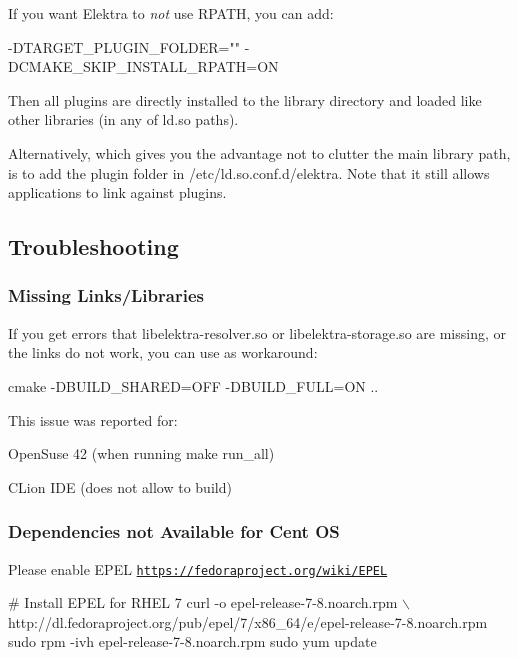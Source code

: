 If you want Elektra to {\itshape not} use {\ttfamily R\+P\+A\+TH}, you can add\+:


\begin{DoxyCode}
-DTARGET\_PLUGIN\_FOLDER="" -DCMAKE\_SKIP\_INSTALL\_RPATH=ON
\end{DoxyCode}


Then all plugins are directly installed to the library directory and loaded like other libraries (in any of {\ttfamily ld.\+so} paths).

Alternatively, which gives you the advantage not to clutter the main library path, is to add the plugin folder in {\ttfamily /etc/ld.so.\+conf.\+d/elektra}. Note that it still allows applications to link against plugins.

\subsection*{Troubleshooting}

\subsubsection*{Missing Links/\+Libraries}

If you get errors that {\ttfamily libelektra-\/resolver.\+so} or {\ttfamily libelektra-\/storage.\+so} are missing, or the links do not work, you can use as workaround\+:


\begin{DoxyCode}
cmake -DBUILD\_SHARED=OFF -DBUILD\_FULL=ON ..
\end{DoxyCode}


This issue was reported for\+:


\begin{DoxyItemize}
\item Open\+Suse 42 (when running {\ttfamily make run\+\_\+all})
\item C\+Lion I\+DE (does not allow to build)
\end{DoxyItemize}

\subsubsection*{Dependencies not Available for Cent OS}

Please enable E\+P\+EL \href{https://fedoraproject.org/wiki/EPEL}{\tt https\+://fedoraproject.\+org/wiki/\+E\+P\+EL}


\begin{DoxyCode}
# Install EPEL for RHEL 7
curl -o epel-release-7-8.noarch.rpm \(\backslash\)
  http://dl.fedoraproject.org/pub/epel/7/x86\_64/e/epel-release-7-8.noarch.rpm
sudo rpm -ivh epel-release-7-8.noarch.rpm
sudo yum update
\end{DoxyCode}


